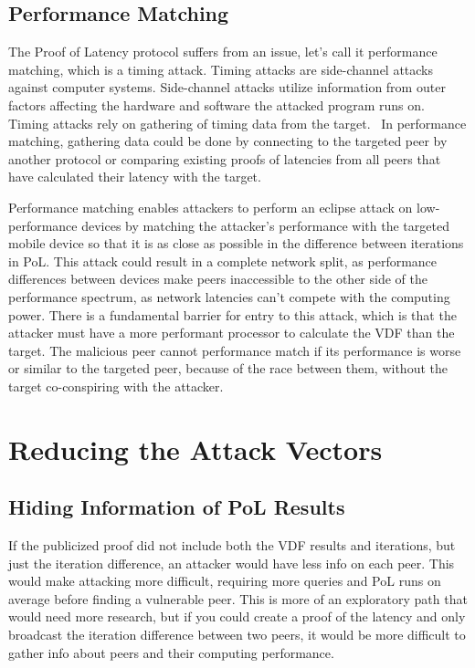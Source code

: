 \subsection{Performance Matching}
The Proof of Latency protocol suffers from an issue, let's call it performance matching, which is a timing attack. Timing attacks are side-channel attacks against computer systems. Side-channel attacks utilize information from outer factors affecting the hardware and software the attacked program runs on. Timing attacks rely on gathering of timing data from the target.~\cite{noauthor_undated-mp} In performance matching, gathering data could be done by connecting to the targeted peer by another protocol or comparing existing proofs of latencies from all peers that have calculated their latency with the target.

Performance matching enables attackers to perform an eclipse attack on low-performance devices by matching the attacker's performance with the targeted mobile device so that it is as close as possible in the difference between iterations in PoL. This attack could result in a complete network split, as performance differences between devices make peers inaccessible to the other side of the performance spectrum, as network latencies can't compete with the computing power. There is a fundamental barrier for entry to this attack, which is that the attacker must have a more performant processor to calculate the VDF than the target. The malicious peer cannot performance match if its performance is worse or similar to the targeted peer, because of the race between them, without the target co-conspiring with the attacker.

\section{Reducing the Attack Vectors}
\subsection{Hiding Information of PoL Results}
If the publicized proof did not include both the VDF results and iterations, but just the iteration difference, an attacker would have less info on each peer. This would make attacking more difficult, requiring more queries and PoL runs on average before finding a vulnerable peer. This is more of an exploratory path that would need more research, but if you could create a proof of the latency and only broadcast the iteration difference between two peers, it would be more difficult to gather info about peers and their computing performance.

